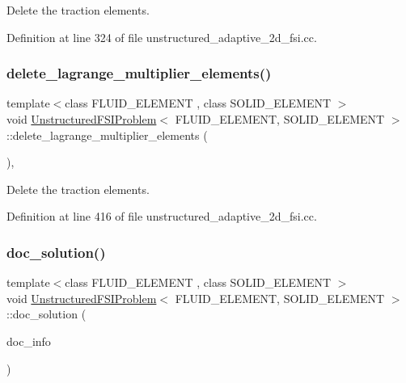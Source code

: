 Delete the traction elements. 



Definition at line 324 of file unstructured\+\_\+adaptive\+\_\+2d\+\_\+fsi.\+cc.

\mbox{\label{classUnstructuredFSIProblem_ac11cb83a769e5d741e0e091b7667ec1b}} 
\subsubsection{\texorpdfstring{delete\+\_\+lagrange\+\_\+multiplier\+\_\+elements()}{delete\_lagrange\_multiplier\_elements()}}
{\footnotesize\ttfamily template$<$class F\+L\+U\+I\+D\+\_\+\+E\+L\+E\+M\+E\+NT , class S\+O\+L\+I\+D\+\_\+\+E\+L\+E\+M\+E\+NT $>$ \\
void \hyperlink{classUnstructuredFSIProblem}{Unstructured\+F\+S\+I\+Problem}$<$ F\+L\+U\+I\+D\+\_\+\+E\+L\+E\+M\+E\+NT, S\+O\+L\+I\+D\+\_\+\+E\+L\+E\+M\+E\+NT $>$\+::delete\+\_\+lagrange\+\_\+multiplier\+\_\+elements (\begin{DoxyParamCaption}{ }\end{DoxyParamCaption})\hspace{0.3cm}{\ttfamily [inline]}, {\ttfamily [private]}}



Delete the traction elements. 



Definition at line 416 of file unstructured\+\_\+adaptive\+\_\+2d\+\_\+fsi.\+cc.

\mbox{\label{classUnstructuredFSIProblem_a15f581318b505de07f50bd570da8c8d0}} 
\subsubsection{\texorpdfstring{doc\+\_\+solution()}{doc\_solution()}}
{\footnotesize\ttfamily template$<$class F\+L\+U\+I\+D\+\_\+\+E\+L\+E\+M\+E\+NT , class S\+O\+L\+I\+D\+\_\+\+E\+L\+E\+M\+E\+NT $>$ \\
void \hyperlink{classUnstructuredFSIProblem}{Unstructured\+F\+S\+I\+Problem}$<$ F\+L\+U\+I\+D\+\_\+\+E\+L\+E\+M\+E\+NT, S\+O\+L\+I\+D\+\_\+\+E\+L\+E\+M\+E\+NT $>$\+::doc\+\_\+solution (\begin{DoxyParamCaption}\item[{Doc\+Info \&}]{doc\+\_\+info }\end{DoxyParamCaption})}



